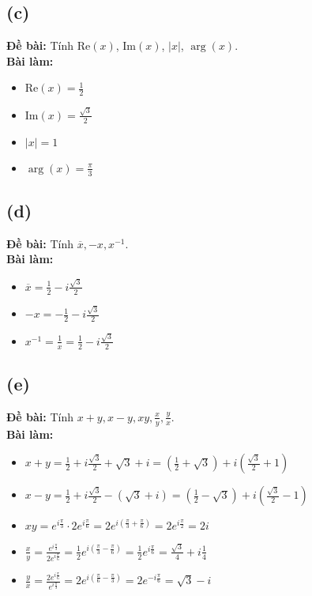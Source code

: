 \subsection{(c)}
\textbf{Đề bài:} Tính $\mathrm{Re}(x)$, $\mathrm{Im}(x)$, $|x|$, $\arg(x)$.\\
\textbf{Bài làm:}
\begin{itemize}
    \item $\mathrm{Re}(x) = \frac{1}{2}$
    \item $\mathrm{Im}(x) = \frac{\sqrt{3}}{2}$
    \item $|x| = 1$
    \item $\arg(x) = \frac{\pi}{3}$
\end{itemize}

\subsection{(d)}
\textbf{Đề bài:} Tính $\overline{x},-x,x^{-1}$.\\
\textbf{Bài làm:}
\begin{itemize}
    \item $\overline{x} = \frac{1}{2} - i\frac{\sqrt{3}}{2}$
    \item $-x = -\frac{1}{2} - i\frac{\sqrt{3}}{2}$
    \item $x^{-1} = \frac{1}{x} = \frac{1}{2} - i\frac{\sqrt{3}}{2}$
\end{itemize}

\subsection{(e)}
\textbf{Đề bài:} Tính $x + y, x - y, xy, \frac{x}{y}, \frac{y}{x}$.\\
\textbf{Bài làm:}
\begin{itemize}
    \item $x + y = \frac{1}{2} + i\frac{\sqrt{3}}{2} + \sqrt{3} + i = \left(\frac{1}{2} + \sqrt{3}\right) + i\left(\frac{\sqrt{3}}{2} + 1\right)$
    \item $x - y = \frac{1}{2} + i\frac{\sqrt{3}}{2} - \left(\sqrt{3} + i\right) = \left(\frac{1}{2} - \sqrt{3}\right) + i\left(\frac{\sqrt{3}}{2} - 1\right)$
    \item $xy = e^{i\frac{\pi}{3}} \cdot 2e^{i\frac{\pi}{6}} = 2e^{i\left(\frac{\pi}{3} + \frac{\pi}{6}\right)} = 2e^{i\frac{\pi}{2}} = 2i$
    \item $\frac{x}{y} = \frac{e^{i\frac{\pi}{3}}}{2e^{i\frac{\pi}{6}}} = \frac{1}{2}e^{i\left(\frac{\pi}{3} - \frac{\pi}{6}\right)} = \frac{1}{2}e^{i\frac{\pi}{6}} = \frac{\sqrt{3}}{4} + i\frac{1}{4}$
    \item $\frac{y}{x} = \frac{2e^{i\frac{\pi}{6}}}{e^{i\frac{\pi}{3}}} = 2e^{i\left(\frac{\pi}{6} - \frac{\pi}{3}\right)} = 2e^{-i\frac{\pi}{6}} = \sqrt{3} - i$
\end{itemize}

